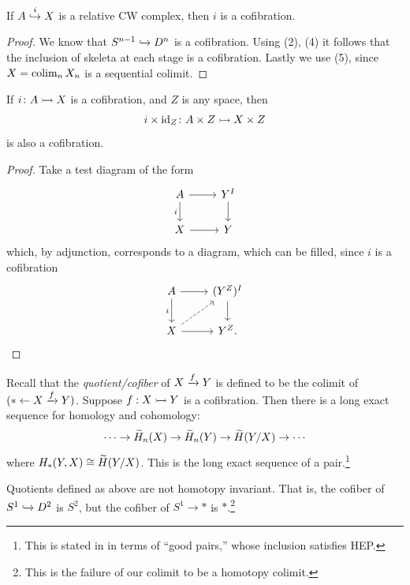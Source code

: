 \documentclass{article}[11pt]
\begin{document}
\begin{corollary} If $A\overset{i}{\hookrightarrow} X$ is a relative CW complex, then $i$ is a cofibration.
\end{corollary}
\begin{proof} We know that $S^{n-1}\xhookrightarrow{} D^n$ is a cofibration. Using (2), (4) it follows that the inclusion of skeleta at each stage is a cofibration. Lastly we use (5), since $X = \mathop{\operatorname*{colim}}_n X_n$ is a sequential colimit.
\end{proof}

\begin{proposition}\label{prop:cof-times-space} If $i\colon A \rightarrowtail X$ is a cofibration, and $Z$ is any space, then
\begin{align*}
	i\times\text{id}_Z\colon A\times Z \rightarrowtail X\times Z
\end{align*}
is also a cofibration.
\end{proposition}
\begin{proof} Take a test diagram of the form
\[
	\begin{tikzcd}
	A\rar\dar["i" left] & Y^I\dar \\
	X\rar & Y
	\end{tikzcd}
\]
which, by adjunction, corresponds to a diagram, which can be filled, since $i$ is a cofibration
\[
	\begin{tikzcd}
	A\dar["i" left]\rar & (Y^Z)^I\dar \\
	X\rar\ar[ur,dashed] & Y^Z.
	\end{tikzcd}
\]
\end{proof}

Recall that the \textit{quotient/cofiber} of $X\xrightarrow{f} Y$ is defined to be the colimit of $(\ast \leftarrow X \xrightarrow{f} Y)$. Suppose $f : X\rightarrowtail Y$ is a cofibration. Then there is a long exact sequence for homology and cohomology:
\begin{align*}
	\cdots \to \widetilde{H}_n(X) \to \widetilde{H}_n(Y) \to \widetilde{H}(Y/X) \to \cdots
\end{align*}
where $H_\ast (Y,X) \cong \widetilde{H}(Y/X)$. This is the long exact sequence of a pair.\footnote{This is stated in \cite{hatcher} in terms of ``good pairs,'' whose inclusion satisfies HEP.}


\begin{remark} Quotients defined as above are not homotopy invariant. That is, the cofiber of $S^1\xhookrightarrow{} D^2$ is $S^2$, but the cofiber of $S^1 \to \ast$ is $\ast$.\footnote{This is the failure of our colimit to be a homotopy colimit.}
\end{remark}
\end{document}
